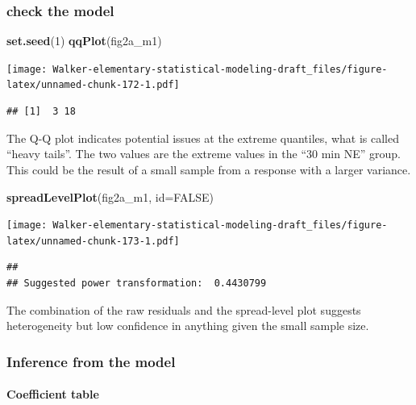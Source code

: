 \documentclass[]{book}
\newenvironment{Shaded}{\begin{snugshade}}{\end{snugshade}}
\newcommand{\DataTypeTok}[1]{\textcolor[rgb]{0.13,0.29,0.53}{#1}}
\newcommand{\DecValTok}[1]{\textcolor[rgb]{0.00,0.00,0.81}{#1}}
\newcommand{\KeywordTok}[1]{\textcolor[rgb]{0.13,0.29,0.53}{\textbf{#1}}}
\newcommand{\NormalTok}[1]{#1}
\newcommand{\OtherTok}[1]{\textcolor[rgb]{0.56,0.35,0.01}{#1}}
\let\oldparagraph\paragraph
\renewcommand{\paragraph}[1]{\oldparagraph{#1}\mbox{}}
\begin{document}
\hypertarget{check-the-model}{%
\subsubsection{check the model}\label{check-the-model}}

\begin{Shaded}
\begin{Highlighting}[]
\KeywordTok{set.seed}\NormalTok{(}\DecValTok{1}\NormalTok{)}
\KeywordTok{qqPlot}\NormalTok{(fig2a_m1)}
\end{Highlighting}
\end{Shaded}

\texttt{[image: Walker-elementary-statistical-modeling-draft\_files/figure-latex/unnamed-chunk-172-1.pdf]}

\begin{verbatim}
## [1]  3 18
\end{verbatim}

The Q-Q plot indicates potential issues at the extreme quantiles, what is called ``heavy tails''. The two values are the extreme values in the ``30 min NE'' group. This could be the result of a small sample from a response with a larger variance.

\begin{Shaded}
\begin{Highlighting}[]
\KeywordTok{spreadLevelPlot}\NormalTok{(fig2a_m1, }\DataTypeTok{id=}\OtherTok{FALSE}\NormalTok{)}
\end{Highlighting}
\end{Shaded}

\texttt{[image: Walker-elementary-statistical-modeling-draft\_files/figure-latex/unnamed-chunk-173-1.pdf]}

\begin{verbatim}
## 
## Suggested power transformation:  0.4430799
\end{verbatim}

The combination of the raw residuals and the spread-level plot suggests heterogeneity but low confidence in anything given the small sample size.

\hypertarget{inference-from-the-model-1}{%
\subsubsection{Inference from the model}\label{inference-from-the-model-1}}

\hypertarget{coefficient-table-1}{%
\paragraph{Coefficient table}\label{coefficient-table-1}}
\end{document}
